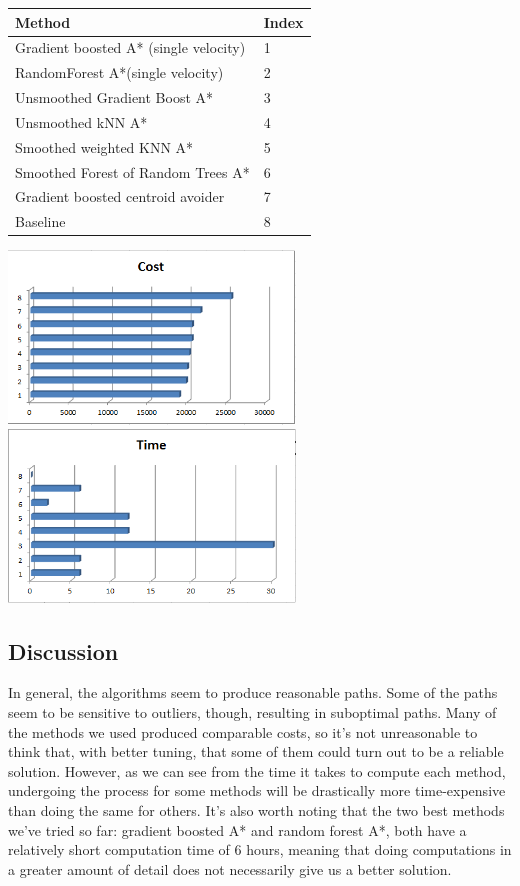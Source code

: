 \documentclass{article}[12pt]
\begin{document}
\begin{multicols}{2}
\begingroup
\noindent
\begin{tabular}{ | l | l | }
    \hline
    Method & Index \\ \hline
    Gradient boosted A* (single velocity) & 1\\ \hline
		RandomForest A*(single velocity) & 2 \\ \hline
		Unsmoothed Gradient Boost A* & 3 \\ \hline
		Unsmoothed kNN A* & 4 \\ \hline
		Smoothed weighted KNN A* & 5 \\ \hline
		Smoothed Forest of Random Trees A* & 6 \\ \hline
		Gradient boosted centroid avoider & 7\\ \hline
		Baseline & 8 \\ \hline
\end{tabular}
\begin{center}
    \includegraphics[width=3in]{results.png}
		\includegraphics[width=3in]{time.png}
	\end{center}
\endgroup

\subsection{Discussion}
In general, the algorithms seem to produce reasonable paths. Some of the paths seem to be sensitive to outliers, though, resulting in suboptimal paths. Many of the methods we used produced comparable costs, so it's not unreasonable to think that, with better tuning, that some of them could turn out to be a reliable solution. However, as we can see from the time it takes to compute each method, undergoing the process for some methods will be drastically more time-expensive than doing the same for others. It's also worth noting that the two best methods we've tried so far: gradient boosted A* and random forest A*, both have a relatively short computation time of 6 hours, meaning that doing computations in a greater amount of detail does not necessarily give us a better solution.  


\end{multicols}
\end{document}
